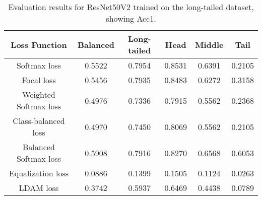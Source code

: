 \begin{table}[H]
    \centering
    \begin{tabular}{cccccc}
        \toprule
        Loss Function & Balanced & Long-tailed & Head & Middle & Tail \\ 
        \midrule
        Softmax loss   & 0.5522 & 0.7954 & 0.8531 & 0.6391 & 0.2105 \\
        Focal loss   & 0.5456 & 0.7935 & 0.8483 & 0.6272 & 0.3158 \\
        Weighted Softmax loss   & 0.4976 & 0.7336 & 0.7915 & 0.5562 & 0.2368 \\
        Class-balanced loss   & 0.4970 & 0.7450 & 0.8069 & 0.5562 & 0.2105 \\
        Balanced Softmax loss   & 0.5908 & 0.7916 & 0.8270 & 0.6568 & 0.6053 \\
        Equalization loss   & 0.0886 & 0.1399 & 0.1505 & 0.1124 &  0.0263 \\
        LDAM loss   & 0.3742 & 0.5937 & 0.6469 & 0.4438 & 0.0789 \\
        \bottomrule
    \end{tabular}
    \caption{Evaluation results for ResNet50V2 trained on the long-tailed dataset, showing Acc1.}
    \label{tab:resnet_lt_acc1}
\end{table}

